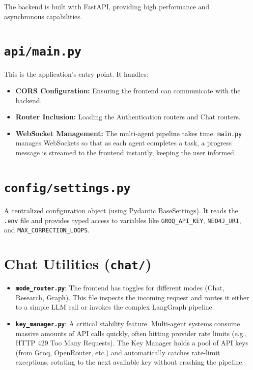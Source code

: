 \documentclass[12pt, a4paper]{report}
\begin{document}
The backend is built with FastAPI, providing high performance and asynchronous capabilities.

\section{\texttt{api/main.py}}
This is the application's entry point. It handles:
\begin{itemize}
    \item \textbf{CORS Configuration:} Ensuring the frontend can communicate with the backend.
    \item \textbf{Router Inclusion:} Loading the Authentication routers and Chat routers.
    \item \textbf{WebSocket Management:} The multi-agent pipeline takes time. \texttt{main.py} manages WebSockets so that as each agent completes a task, a progress message is streamed to the frontend instantly, keeping the user informed.
\end{itemize}

\section{\texttt{config/settings.py}}
A centralized configuration object (using Pydantic BaseSettings). It reads the \texttt{.env} file and provides typed access to variables like \texttt{GROQ\_API\_KEY}, \texttt{NEO4J\_URI}, and \texttt{MAX\_CORRECTION\_LOOPS}.

\section{Chat Utilities (\texttt{chat/})}
\begin{itemize}
    \item \textbf{\texttt{mode\_router.py}}: The frontend has toggles for different modes (Chat, Research, Graph). This file inspects the incoming request and routes it either to a simple LLM call or invokes the complex LangGraph pipeline.
    \item \textbf{\texttt{key\_manager.py}}: A critical stability feature. Multi-agent systems consume massive amounts of API calls quickly, often hitting provider rate limits (e.g., HTTP 429 Too Many Requests). The Key Manager holds a pool of API keys (from Groq, OpenRouter, etc.) and automatically catches rate-limit exceptions, rotating to the next available key without crashing the pipeline.
\end{itemize}
\end{document}
